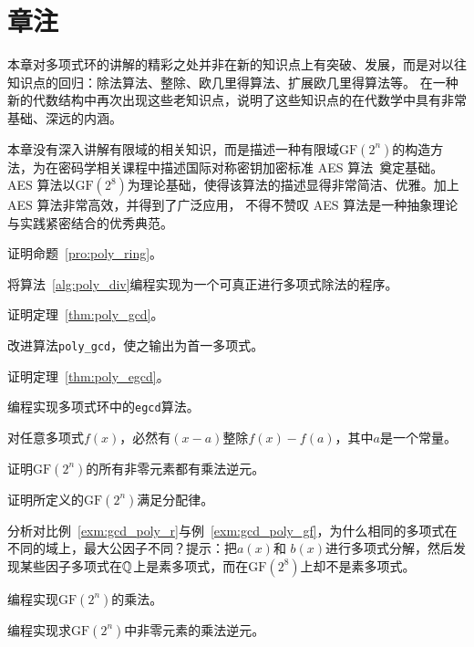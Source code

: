   \section*{章注}
  本章对多项式环的讲解的精彩之处并非在新的知识点上有突破、发展，而是对以往知识点的回归：除法算法、整除、欧几里得算法、扩展欧几里得算法等。
  在一种新的代数结构中再次出现这些老知识点，说明了这些知识点的在代数学中具有非常基础、深远的内涵。
  
  本章没有深入讲解有限域的相关知识，而是描述一种有限域$\mathrm{GF}(2^n)$的构造方法，为在密码学相关课程中描述国际对称密钥加密标准 AES 算法~\cite{DR02}奠定基础。
  AES 算法以$\mathrm{GF}(2^8)$为理论基础，使得该算法的描述显得非常简洁、优雅。加上 AES 算法非常高效，并得到了广泛应用，
  不得不赞叹 AES 算法是一种抽象理论与实践紧密结合的优秀典范。
  
 \begin{problemset}
  \item 证明命题~\ref{pro:poly_ring}。
  
  \item 将算法~\ref{alg:poly_div}编程实现为一个可真正进行多项式除法的程序。
  
  \item 证明定理~\ref{thm:poly_gcd}。
  
  \item 改进算法\lstinline|poly_gcd|，使之输出为首一多项式。
  
  \item 证明定理~\ref{thm:poly_egcd}。
  
  \item 编程实现多项式环中的\texttt{egcd}算法。
  
  \item 对任意多项式$f(x)$，必然有$(x-a)$整除$f(x) - f(a)$，其中$a$是一个常量。
  
  \item 证明$\mathrm{GF}(2^n)$的所有非零元素都有乘法逆元。
  
  \item 证明所定义的$\mathrm{GF}(2^n)$满足分配律。
  
  \item 分析对比例~\ref{exm:gcd_poly_r}与例~\ref{exm:gcd_poly_gf}，为什么相同的多项式在不同的域上，最大公因子不同？提示：把$a(x)$和
  $b(x)$进行多项式分解，然后发现某些因子多项式在${\mathbb Q}$上是素多项式，而在$\mathrm{GF}(2^8)$上却不是素多项式。
     
  \item 编程实现$\mathrm{GF}(2^n)$的乘法。
  
  \item 编程实现求$\mathrm{GF}(2^n)$中非零元素的乘法逆元。
  \end{problemset}
